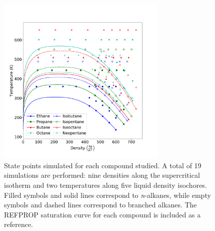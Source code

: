 \documentclass[journal=jctc,manuscript=article]{achemso}
\begin{document}
\begin{figure}[htb!]
	\centering
	\includegraphics[width=3.2in]{simulation_conditions}
	\caption{State points simulated for each compound studied. A total of 19 simulations are performed: nine densities along the supercritical isotherm and two temperatures along five liquid density isochores. Filled symbols and solid lines correspond to \textit{n}-alkanes, while empty symbols and dashed lines correspond to branched alkanes. The REFPROP saturation curve for each compound is included as a reference.}
	\label{fig:simulation_conditions}
\end{figure}
\end{document}
